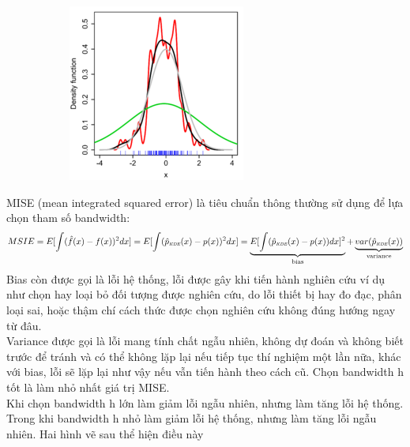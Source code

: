 \documentclass[a4paper, 13pt]{report}
\begin{document}
\begin{figure}[!h]
  \begin{subfigure}[b]{0.5\textwidth}
	   \label{tab:example}
        \includegraphics[width=\linewidth]{220px-Comparison_of_1D_bandwidth_selectors}
  \end{subfigure}%
\end{figure}
\FloatBarrier
MISE (mean integrated squared error) là tiêu chuẩn thông thường sử dụng để lựa chọn tham số bandwidth:
\[
MSIE = E[\int(\hat{f}(x)-f(x))^2dx] = E[\int(\hat{p}_\textit{\tiny\tiny KDE}(x) - p(x))^2dx] = 
\underbrace{E[\int(\hat{p}_\textit{\tiny\tiny KDE}(x) - p(x))dx]^2}_{\text{bias}} + 
\underbrace{var(\hat{p}_\textit{\tiny\tiny KDE}(x))}_{\text{variance}}
\]
Bias còn được gọi là lỗi hệ thống, lỗi được gây khi tiến hành nghiên cứu ví dụ như chọn hay loại bỏ đối tượng được nghiên cứu, do lỗi thiết bị hay đo đạc, phân loại sai, hoặc thậm chí cách thức được chọn nghiên cứu không đúng hướng ngay từ đâu.\\ Variance được gọi là lỗi mang tính chất ngẫu nhiên, không dự đoán và không biết trước để tránh và có thể không lặp lại nếu tiếp tục thí nghiệm một lần nữa, khác với bias, lỗi sẽ lặp lại như vậy nếu vẫn tiến hành theo cách cũ. Chọn bandwidth h tốt là làm nhỏ nhất giá trị MISE.\\
Khi chọn bandwidth h lớn làm giảm lỗi ngẫu nhiên, nhưng làm tăng lỗi hệ thống. Trong khi bandwidth h nhỏ làm giảm lỗi hệ thống, nhưng làm tăng lỗi ngẫu nhiên. Hai hình vẽ sau thể hiện điều này 
\end{document}
